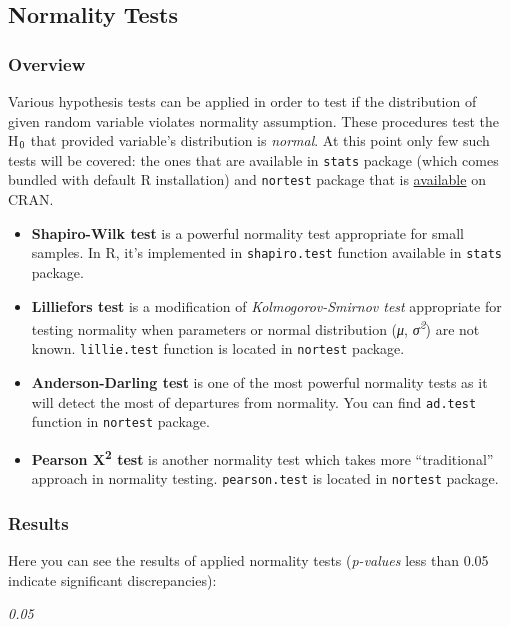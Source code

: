 \documentclass[]{article}
\newcommand{\textsubscr}[1]{\ensuremath{_{\scriptsize\textrm{#1}}}}
\begin{document}
\subsection{Normality Tests}

\subsubsection{Overview}

Various hypothesis tests can be applied in order to test if the
distribution of given random variable violates normality assumption.
These procedures test the H\textsubscr{0} that provided variable's
distribution is \emph{normal}. At this point only few such tests will be
covered: the ones that are available in \texttt{stats} package (which
comes bundled with default R installation) and \texttt{nortest} package
that is
\href{http://cran.r-project.org/web/packages/nortest/index.html}{available}
on CRAN.

\begin{itemize}
\item
  \textbf{Shapiro-Wilk test} is a powerful normality test appropriate
  for small samples. In R, it's implemented in \texttt{shapiro.test}
  function available in \texttt{stats} package.
\item
  \textbf{Lilliefors test} is a modification of \emph{Kolmogorov-Smirnov
  test} appropriate for testing normality when parameters or normal
  distribution (\emph{μ}, \emph{σ\textsuperscript{2}}) are not known.
  \texttt{lillie.test} function is located in \texttt{nortest} package.
\item
  \textbf{Anderson-Darling test} is one of the most powerful normality
  tests as it will detect the most of departures from normality. You can
  find \texttt{ad.test} function in \texttt{nortest} package.
\item
  \textbf{Pearson Χ\textsuperscript{2} test} is another normality test
  which takes more ``traditional'' approach in normality testing.
  \texttt{pearson.test} is located in \texttt{nortest} package.
\end{itemize}
\subsubsection{Results}

Here you can see the results of applied normality tests (\emph{p-values}
less than 0.05 indicate significant discrepancies):

\emph{0.05}
\end{document}
